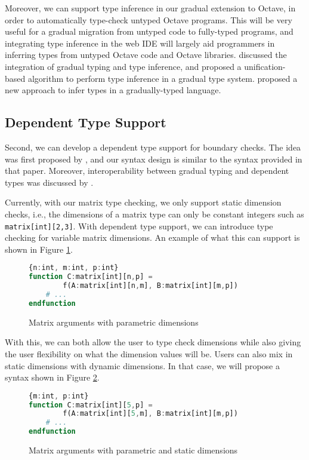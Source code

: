 Moreover, we can support type inference in our gradual extension to Octave, in order to automatically type-check untyped Octave programs. This will be very useful for a gradual migration from untyped code to fully-typed programs, and integrating type inference in the web IDE will largely aid programmers in inferring types from untyped Octave code and Octave libraries. \citet{siek2008gradual} discussed the integration of gradual typing and type inference, and proposed a unification-based algorithm to perform type inference in a gradual type system. \citet{garcia2015principal} proposed a new approach to infer types in a gradually-typed language. 

\subsection{Dependent Type Support}
Second, we can develop a dependent type support for boundary checks. The idea was first proposed by \citet{xi1998eliminating}, and our syntax design is similar to the syntax provided in that paper. Moreover, interoperability between gradual typing and dependent types was discussed by \citet{lehmann2017gradual}.

Currently, with our matrix type checking, we only support static dimension checks, i.e., the dimensions of a matrix type can only be constant integers such as {\tt matrix[int][2,3]}. With dependent type support, we can introduce type checking for variable matrix dimensions. An example of what this can support is shown in Figure \ref{fig:variableDimensions}.

\begin{figure}[h]
    \begin{lstlisting}[language=octave]
{n:int, m:int, p:int}
function C:matrix[int][n,p] =
        f(A:matrix[int][n,m], B:matrix[int][m,p])
    # ...
endfunction
    \end{lstlisting}
    \caption[]{{Matrix arguments with parametric dimensions}}
    \label{fig:variableDimensions}
\end{figure}

With this, we can both allow the user to type check dimensions while also giving the user flexibility on what the dimension values will be. Users can also mix in static dimensions with dynamic dimensions. In that case, we will propose a syntax shown in Figure \ref{fig:variableAndStaticDimensions}.

\begin{figure}[h]
    \begin{lstlisting}[language=octave]
{m:int, p:int}
function C:matrix[int][5,p] = 
        f(A:matrix[int][5,m], B:matrix[int][m,p])
    # ...
endfunction
    \end{lstlisting}
    \caption[]{{Matrix arguments with parametric and static dimensions}}
    \label{fig:variableAndStaticDimensions}
\end{figure}

